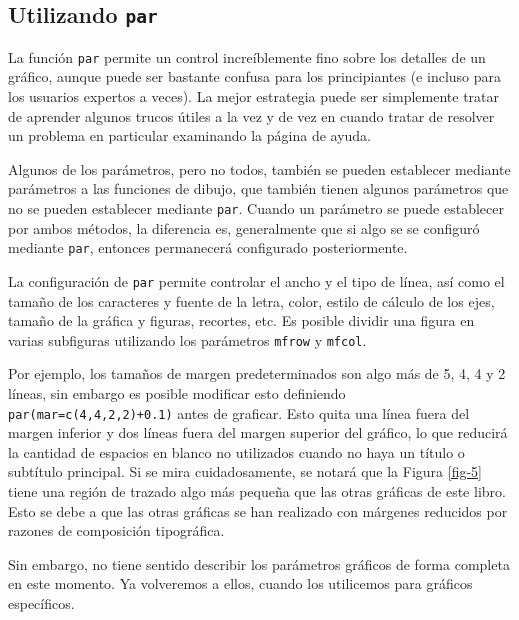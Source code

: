 \subsection{Utilizando \texttt{par}}

La función \texttt{par} permite un control increíblemente fino sobre los
detalles de un gráfico, aunque puede ser bastante confusa para los principiantes
(e incluso para los usuarios expertos a veces). La mejor estrategia puede ser
simplemente tratar de aprender algunos trucos útiles a la vez y de vez en cuando
tratar de resolver un problema en particular examinando la página de ayuda.

Algunos de los parámetros, pero no todos, también se pueden establecer mediante
parámetros a las funciones de dibujo, que también tienen algunos parámetros que
no se pueden establecer mediante \texttt{par}.  Cuando un parámetro se puede
establecer por ambos métodos, la diferencia es, generalmente que si algo se se
configuró mediante \texttt{par}, entonces permanecerá configurado
posteriormente.

La configuración de \texttt{par} permite controlar el ancho y el tipo de línea,
así como el tamaño de los caracteres y fuente de la letra, color, estilo de
cálculo de los ejes, tamaño de la gráfica y figuras, recortes, etc. Es posible
dividir una figura en varias subfiguras utilizando los parámetros \texttt{mfrow}
y \texttt{mfcol}.

Por ejemplo, los tamaños de margen predeterminados son algo más de 5, 4, 4 y 2
líneas, sin embargo es posible modificar esto definiendo \texttt{par(mar=c(4,4,2,2)+0.1)} antes de graficar. Esto
quita una línea fuera del margen inferior y dos líneas fuera del margen superior
del gráfico, lo que reducirá la cantidad de espacios en blanco no utilizados
cuando no haya un título o subtítulo principal. Si se mira cuidadosamente, se
notará que la Figura \ref{fig-5} tiene una región de trazado algo más
pequeña que las otras gráficas de este libro. Esto se debe a que las otras
gráficas se han realizado con márgenes reducidos por razones de composición
tipográfica.

Sin embargo, no tiene sentido describir los parámetros gráficos de forma
completa en este momento. Ya volveremos a ellos, cuando los utilicemos
para gráficos específicos.

